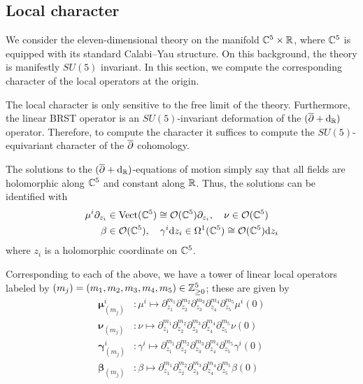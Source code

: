 \subsection{Local character}\label{sec:locchar}

We consider the eleven-dimensional theory on the manifold $\mathbb C^5 \times \mathbb R$, where $\mathbb C^5$ is equipped with its standard Calabi--Yau structure. 
On this background, the theory is manifestly $SU(5)$ invariant. 
In this section, we compute the corresponding character of the local operators at the origin. 

The local character is only sensitive to the free limit of the theory.
Furthermore, the linear BRST operator is an $SU(5)$-invariant deformation of the $(\overline{\partial} + {\rm d}_{\mathbb R})$ operator. 
Therefore, to compute the character it suffices to compute the $SU(5)$-equivariant character of the $\overline{\partial}$ cohomology. 

The solutions to the $(\overline{\partial} + {\rm d}_{\mathbb R})$-equations of motion simply say that all fields are holomorphic along $\mathbb C^5$ and constant along $\mathbb R$. 
Thus, the solutions can be identified with 
\begin{align*}
\mu^{i}\partial_{z_i} & \in {\rm Vect}(\mathbb C^5) \cong \mathcal O(\mathbb{C}^5)\partial_{z_i},\quad 
\nu \in \mathcal O (\mathbb{C}^5) \\
\beta & \in \mathcal O (\mathbb{C}^5), \quad \gamma^{i} {\rm d} z_i \in \Omega^{1}(\mathbb C^5) \cong \mathcal O (\mathbb{C}^5){\rm d} z_i 
\end{align*}
where $z_i$ is a holomorphic coordinate on $\mathbb C^5$. 

Corresponding to each of the above, we have a tower of linear local operators labeled by $(m_j) = (m_1, m_2, m_3, m_4, m_5)\in \mathbb{Z}^5_{\geq 0}$; these are given by
\begin{align*}
 \boldsymbol{\mu}^{i}_{(m_j)} &: \mu^{i}\mapsto \partial_{z_1}^{m_1}\partial_{z_2}^{m_2}\partial_{z_3}^{m_3}\partial_{z_4}^{m_4}\partial_{z_5}^{m_5}\mu^{i} (0) \\
\boldsymbol{\nu}_{(m_j)} &: \nu\mapsto \partial_{z_1}^{m_1}\partial_{z_2}^{m_2}\partial_{z_3}^{m_3}\partial_{z_4}^{m_4}\partial_{z_5}^{m_5}\nu (0) \\
\boldsymbol{\gamma}^{i}_{(m_j)} &: \gamma^{i}\mapsto \partial_{z_1}^{m_1}\partial_{z_2}^{m_2}\partial_{z_3}^{m_3}\partial_{z_4}^{m_4}\partial_{z_5}^{m_5}\gamma^{i} (0) \\
 \boldsymbol{\beta}_{(m_j)} &: \beta\mapsto \partial_{z_1}^{m_1}\partial_{z_2}^{m_2}\partial_{z_3}^{m_3}\partial_{z_4}^{m_4}\partial_{z_5}^{m_5}\beta (0)
\end{align*}

